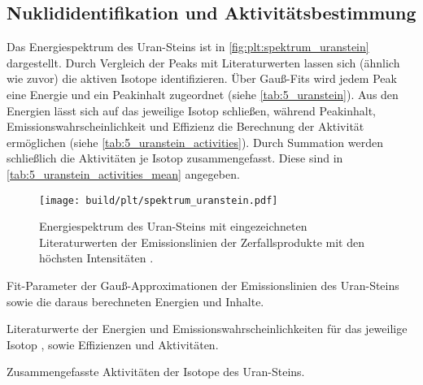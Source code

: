 \subsection{Nuklididentifikation und Aktivitätsbestimmung} \label{sec:auswertung:uranstein}
Das Energiespektrum des Uran-Steins ist in \autoref{fig:plt:spektrum_uranstein} dargestellt.
Durch Vergleich der Peaks mit Literaturwerten lassen sich
    (ähnlich wie zuvor)
die aktiven Isotope identifizieren.
Über Gauß-Fits
wird jedem Peak eine Energie und ein Peakinhalt zugeordnet
    (siehe \autoref{tab:5_uranstein}).
Aus den Energien lässt sich auf das jeweilige Isotop schließen,
während Peakinhalt, Emissionswahrscheinlichkeit und Effizienz die Berechnung der Aktivität ermöglichen
    (siehe \autoref{tab:5_uranstein_activities}).
Durch Summation werden schließlich die Aktivitäten je Isotop zusammengefasst.
Diese sind in \autoref{tab:5_uranstein_activities_mean} angegeben.

\begin{figure}
    \centering
    \texttt{[image: build/plt/spektrum\_uranstein.pdf]}
    \caption{Energiespektrum des Uran-Steins mit eingezeichneten Literaturwerten der Emissionslinien der Zerfallsprodukte mit den höchsten Intensitäten \cite{lara}.}
    \label{fig:plt:spektrum_uranstein}
\end{figure}

\begin{table}
    \centering
    \caption{
        Fit-Parameter der Gauß-Approximationen der Emissionslinien des Uran-Steins
        sowie die daraus berechneten Energien und Inhalte.
    }
    \label{tab:5_uranstein}
\end{table}

\begin{table}
    \centering
    \caption{
        Literaturwerte der Energien und Emissionswahrscheinlichkeiten für das jeweilige Isotop \cite{lara},
        sowie Effizienzen und Aktivitäten.
    }
    \label{tab:5_uranstein_activities}
\end{table}

\begin{table}
    \centering
    \caption{Zusammengefasste Aktivitäten der Isotope des Uran-Steins.}
    \label{tab:5_uranstein_activities_mean}
\end{table}
